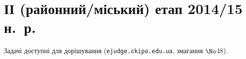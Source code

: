 
\section{ІІ (районний/міський) етап 2014/15 н.~р.}

Задачі доступні для дорішування (\verb"ejudge.ckipo.edu.ua", змагання $\No$48).

\renewenvironment{problemAllDefault}[1]{\vspace{10mm}\par\begin{problem}{#1}{Клавіатура (stdin) або файл input.txt}{Екран (stdout) або файл output.txt}{1 сек}{64 мегабайти}}{\end{problem}}

	

	

	

	


